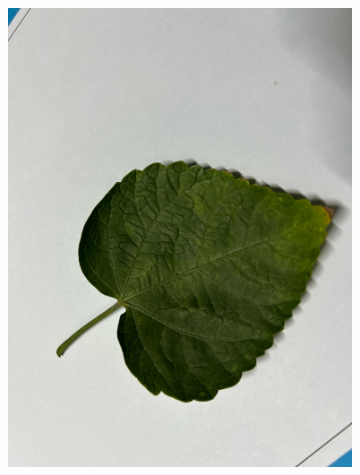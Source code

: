 \documentclass[twocolumn]{article}
\begin{document}
\begin{figure}[H]
    \begin{subfigure}[b]{0.30\columnwidth}
        \includegraphics[width=\textwidth]{rosa4}
    \end{subfigure}
    \hfill
    \begin{subfigure}[b]{0.30\columnwidth}

\end{subfigure}
\end{figure}
\end{document}
